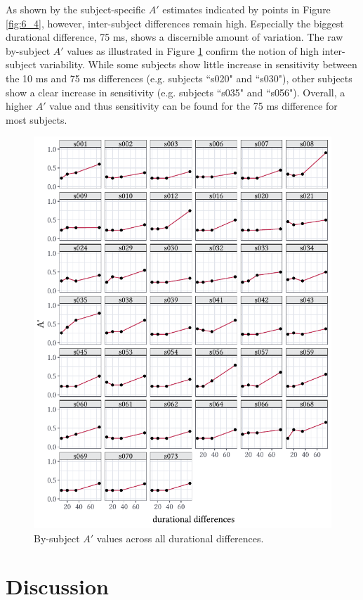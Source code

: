 As shown by the subject-specific $A'$ estimates indicated by points in Figure \ref{fig:6_4}, however, inter-subject differences remain high. Especially the biggest durational difference, 75 ms, shows a discernible amount of variation. The raw by-subject $A'$ values as illustrated in Figure \ref{fig:6_5} confirm the notion of high inter-subject variability. While some subjects show little increase in sensitivity between the 10 ms and 75 ms differences (e.g. subjects ``s020" and ``s030"), other subjects show a clear increase in sensitivity (e.g. subjects ``s035" and ``s056"). Overall, a higher $A'$ value and thus sensitivity can be found for the 75 ms difference for most subjects.

\begin{figure}
    \centering
    \includegraphics[]{figures/fig6.5.pdf}
    \caption{By-subject $A'$ values across all durational differences.}
    \label{fig:6_5}
\end{figure}

\section{Discussion}\label{section06_4}

